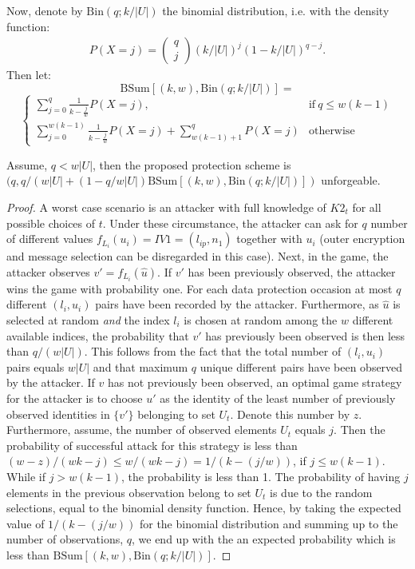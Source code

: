 {Now, denote by $\text{Bin}(q; k/|U|)$ the binomial distribution, i.e. with the density function:
\begin{eqnarray*}
P(X=j) = 
\begin{pmatrix}
q \\
j
\end{pmatrix}
(k/|U|)^j(1-k/|U|)^{q-j}.
\end{eqnarray*}
Then let: 
\[
 \text{BSum}[(k,w),\text{Bin}(q;k/|U|)] =
 \]
 \[
\begin{cases}
\sum\limits_{j=0}^{q} \frac{1}{k-\frac{j}{w}} P(X=j), & \text{if} \ q \leq w(k-1) \\
\sum\limits_{j=0}^{w(k-1)}\!\frac{1}{k-\frac{j}{w}} P(X=j) + \!\!\!\!\!\! \sum\limits_{w(k-1)+1}^q \!\!\!\!\!P(X=j) & \!\text{otherwise}
\end{cases}
\]
\begin{prop}
\label{analysis:idunforgeable}
Assume, $q < w|U|$, then the proposed protection scheme is \\  $(q,q/(w|U|+(1-q/w|U|)\text{BSum}[(k,w),\text{Bin}(q;k/|U|)])$ unforgeable. 
\end{prop}
\begin{proof}
A worst case scenario is an attacker with full knowledge of $K2_t$ for all possible choices of $t$. Under these circumstance, the attacker can ask for $q$ number of different values $f_{L_i}(u_i) = IV1 = (l_{ip},n_1)$  together with $u_i$ (outer encryption and message selection can be disregarded in this case). Next, in the game, the attacker observes $v' = f_{L_i}(\hat{u})$. If $v'$ has been previously observed, the attacker wins the game with probability one. For each data protection occasion at most $q$ different $(l_{i}, u_i)$ pairs have been recorded by the attacker. Furthermore, as $\hat{u}$ is selected at random \textit{and} the index $l_{i}$ is chosen at random among the $w$ different available indices, the probability that $v'$ has previously been observed is then less than $q/(w|U|)$. This follows from the fact that the total number of $(l_{i}, u_i)$ pairs equals $w|U|$ and that maximum $q$ unique different pairs have been observed by the attacker. If $v$ has not previously been observed, an optimal game strategy for the attacker is to choose $u'$ as the identity of the least number of previously observed identities in $\{v'\}$ belonging to set $U_t$. Denote this number by $z$.  Furthermore, assume, the number of observed elements $U_t$ equals $j$. Then the probability of successful attack for this strategy is less than $(w-z)/(wk-j) \leq w/(wk-j) = 1/(k-(j/w))$, if $j\leq w(k-1)$. While if $j>w(k-1)$, the probability is less than 1. The probability of having $j$ elements in the previous observation belong to set $U_t$ is due to the random selections, equal to the binomial density function. Hence, by taking the expected value of $1/(k-(j/w))$ for the binomial distribution and summing up to the number of observations, $q$, we end up with the an expected probability which is less than $\text{BSum}[(k,w),\text{Bin}(q;k/|U|)]$.

\end{proof}}
